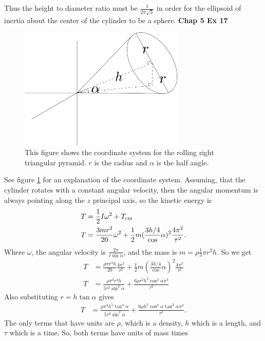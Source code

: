 \documentclass[10pt]{article}
\begin{document}
Thus the height to diameter ratio must be $\frac{1}{2\pi\sqrt 3}$ in order for 
the ellipsoid of inertia about the center of the cylinder to be a sphere.
\textbf{Chap 5 Ex 17}\\
\begin{figure}[h!]
    \centering
    \includegraphics[width=0.7\textwidth]{5Ex17.png}
    \caption{This figure shows the coordinate system for the rolling right
    triangular pyramid.  $r$ is the radius and $\alpha$ is the half angle.}
  \label{fig:5-17}
\end{figure}
See figure \ref{fig:5-17} for an explanation of the coordinate system.
Assuming, that the cylinder rotates with a constant angular velocity, then the
angular momentum is always pointing along the $z$ principal axis, so the 
kinetic energy is
\begin{align*}
  T &= \frac{1}{2}I\omega^2 + T_{\rm{cm}}\\
  T &= \frac{3mr^2}{20}\omega^2 + \frac{1}{2}m(\frac{3h/4}\cos\alpha)^2\frac{4\pi^2}{\tau^2}.
\end{align*}
Where $\omega$, the angular velocity is $\frac{2\pi}{\tau\sin\alpha}$, and the mass is
$m=\rho\frac{1}{3}\pi r^2 h$. So we get
\begin{align*}
  T &= \frac{\rho\pi r^4 h}{20}\frac{4\pi^2}{\tau^2} + \frac{1}{2}m(\frac{3h/4}\cos\alpha)^2\frac{4\pi^2}{\tau^2}\\
  T &= \frac{\rho\pi^3 r^4 h}{5\tau^2\sin^2\alpha} + \frac{6\rho r^2h^3\cos^2\alpha\pi^3}{\tau^2}
\end{align*}
Also substituting $r=h\tan\alpha$ gives
\begin{align*}
  T &= \frac{\rho\pi^3 h^5 \tan^4\alpha}{5\tau^2\sin^2\alpha} + \frac{6\rho h^5\cos^2\alpha\tan^2\alpha\pi^3}{\tau^2}.
\end{align*}
The only terms that have units are $\rho$, which is a density, $h$ which is a
length, and $\tau$ which is a time.  So, both terms have units of mass times
\end{document}
